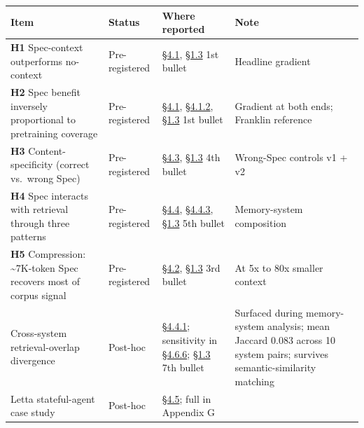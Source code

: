 \begin{landscape}
\begin{longtable}[]{@{}
  >{\raggedright\arraybackslash}p{}
  >{\raggedright\arraybackslash}p{}
  >{\raggedright\arraybackslash}p{}
  >{\raggedright\arraybackslash}p{}@{}}
\toprule
Item & Status & Where reported & Note \\
\midrule
\endhead
\textbf{H1} Spec-context outperforms no-context & Pre-registered & \hyperref[the-cross-subject-gradient-and-its-per-question-mechanism]{§4.1},
\hyperref[what-we-found]{§1.3} 1st bullet & Headline gradient \\
\textbf{H2} Spec benefit inversely proportional to pretraining coverage
& Pre-registered & \hyperref[the-cross-subject-gradient-and-its-per-question-mechanism]{§4.1}, \hyperref[the-gradient-at-the-high-baseline-end-franklin-reference]{§4.1.2}, \hyperref[what-we-found]{§1.3} 1st bullet & Gradient at both
ends; Franklin reference \\
\textbf{H3} Content-specificity (correct vs.~wrong Spec) &
Pre-registered & \hyperref[mechanism-correct-content-not-format]{§4.3}, \hyperref[what-we-found]{§1.3} 4th bullet & Wrong-Spec controls v1 + v2 \\
\textbf{H4} Spec interacts with retrieval through three patterns &
Pre-registered & \hyperref[memory-system-composition]{§4.4}, \hyperref[where-the-spec-helps-where-it-hurts-and-which-question-types-route-to-each]{§4.4.3}, \hyperref[what-we-found]{§1.3} 5th bullet & Memory-system
composition \\
\textbf{H5} Compression: \textasciitilde7K-token Spec recovers most of
corpus signal & Pre-registered & \hyperref[compression-structure-vs.-raw-text]{§4.2}, \hyperref[what-we-found]{§1.3} 3rd bullet & At 5x to 80x
smaller context \\
Cross-system retrieval-overlap divergence & Post-hoc & \hyperref[cross-system-retrieval-providers-do-not-converge]{§4.4.1};
sensitivity in \hyperref[retrieval-overlap-sensitivity-semantic-similarity-matching-k-variation]{§4.6.6}; \hyperref[what-we-found]{§1.3} 7th bullet & Surfaced during memory-system
analysis; mean Jaccard 0.083 across 10 system pairs; survives
semantic-similarity matching \\
Letta stateful-agent case study & Post-hoc & \hyperref[exploratory-case-study-letta-stateful-agent-n3-post-hoc]{§4.5}; full in Appendix G &

\end{longtable}
\end{landscape}
